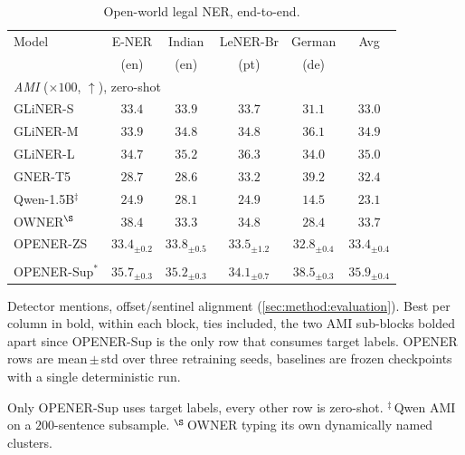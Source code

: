 \begin{table}[tbp]
\centering
\caption{Open-world legal NER, end-to-end.}
\label{tab:legal-main}
\scriptsize
\setlength{\tabcolsep}{1.5pt}
\begin{threeparttable}
\begin{tabular}{@{}l@{\hskip 7pt}ccccc@{}}
\toprule
Model & E-NER & Indian & LeNER-Br & German & Avg \\
      & (en)  & (en)   & (pt)     & (de)   &     \\
\midrule
\multicolumn{6}{l}{\emph{AMI} ($\times100$, $\uparrow$), zero-shot} \\
GLiNER-S & $33.4$ & $33.9$ & $33.7$ & $31.1$ & $33.0$ \\
GLiNER-M & $33.9$ & $34.8$ & $34.8$ & $36.1$ & $34.9$ \\
GLiNER-L & $34.7$ & $\mathbf{35.2}$ & $\mathbf{36.3}$ & $34.0$ & $\mathbf{35.0}$ \\
GNER-T5  & $28.7$ & $28.6$ & $33.2$ & $\mathbf{39.2}$ & $32.4$ \\
Qwen-1.5B$^\ddagger$ & $24.9$ & $28.1$ & $24.9$ & $14.5$ & $23.1$ \\
OWNER$^\S$ & $\mathbf{38.4}$ & $33.3$ & $34.8$ & $28.4$ & $33.7$ \\
\rowcolor{hlyellow} OPENER-ZS & $33.4_{\pm0.2}$ & $33.8_{\pm0.5}$ & $33.5_{\pm1.2}$ & $32.8_{\pm0.4}$ & $33.4_{\pm0.4}$ \\
\addlinespace[1pt]
\multicolumn{6}{l}{\emph{AMI}, with target labels} \\
\rowcolor{hlred} OPENER-Sup$^\ast$ & $35.7_{\pm0.3}$ & $35.2_{\pm0.3}$ & $34.1_{\pm0.7}$ & $38.5_{\pm0.3}$ & $\mathbf{35.9}_{\pm0.4}$ \\
\bottomrule
\end{tabular}
\begin{tablenotes}[flushleft]
\scriptsize
\item Detector mentions, offset/sentinel alignment (\autoref{sec:method:evaluation}). Best per column in bold, within each block, ties included, the two AMI sub-blocks bolded apart since OPENER-Sup is the only row that consumes target labels. OPENER rows are mean\,$\pm$\,std over three retraining seeds, baselines are frozen checkpoints with a single deterministic run. 
\item[$\ast$] Only OPENER-Sup uses target labels, every other row is zero-shot. $^\ddagger$\,Qwen AMI on a $200$-sentence subsample. $^\S$\,OWNER typing its own dynamically named clusters.
\end{tablenotes}
\end{threeparttable}
\end{table}

